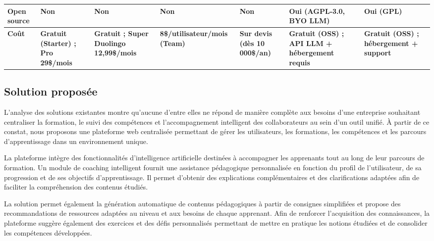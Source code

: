 \begin{table}[H]
\begin{tabular}{|p{2.5cm}|p{1.9cm}|p{1.9cm}|p{1.9cm}|p{1.9cm}|p{2cm}|p{1.9cm}|}
Open source 
& Non 
& Non 
& Non 
& Non 
& Oui (AGPL-3.0, BYO LLM)
& Oui (GPL) \\

\hline

\textbf{Coût} 

& \textbf{Gratuit (Starter) ; Pro 29\$/mois \cite{googleSkills}}

& \textbf{Gratuit ; Super Duolingo 12,99\$/mois \cite{duolingoMax}}

& \textbf{8\$/utilisateur/mois (Team) \cite{learning360prix}}

& \textbf{Sur devis (dès 10\,000\$/an) \cite{cypherLearningprix}}  

& \textbf{Gratuit (OSS) ; API LLM + hébergement requis \cite{openmaic}}

& \textbf{Gratuit (OSS) ; hébergement + support \cite{moodle}} \\

\hline

\end{tabular}%

\end{table}







 
\subsection{Solution proposée}

L'analyse des solutions existantes montre qu'aucune d'entre elles ne répond de manière complète 
aux besoins d'une entreprise souhaitant centraliser la formation, le suivi des compétences et 
l'accompagnement intelligent des collaborateurs au sein d'un outil unifié. À partir de ce constat, 
nous proposons une plateforme web centralisée permettant de gérer les utilisateurs, les formations, 
les compétences et les parcours d'apprentissage dans un environnement unique.

La plateforme intègre des fonctionnalités d'intelligence artificielle destinées à accompagner les 
apprenants tout au long de leur parcours de formation. Un module de coaching intelligent fournit 
une assistance pédagogique personnalisée en fonction du profil de l'utilisateur, de sa progression 
et de ses objectifs d'apprentissage. Il permet d'obtenir des explications complémentaires et des 
clarifications adaptées afin de faciliter la compréhension des contenus étudiés.

La solution permet également la génération automatique de contenus pédagogiques à partir de 
consignes simplifiées et propose des recommandations de ressources adaptées au niveau et aux 
besoins de chaque apprenant. Afin de renforcer l'acquisition des connaissances, la plateforme 
suggère également des exercices et des défis personnalisés permettant de mettre en pratique les 
notions étudiées et de consolider les compétences développées.

